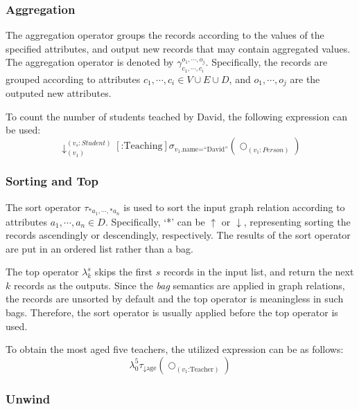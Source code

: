 \subsubsection{Aggregation}
The aggregation operator groups the records according to the values of the specified attributes, and output new records that may contain aggregated values.
The aggregation operator is denoted by $\gamma_{c_1, \cdots, c_i}^{o_1, \cdots, o_j}$.
Specifically, the records are grouped according to attributes $c_1, \cdots, c_i \in V \cup E \cup D$, and $o_1, \cdots, o_j$ are the outputed new attributes.

\begin{example}
    To count the number of students teached by David, the following expression can be used:
    \begin{equation*}
        \downarrow_{(v_1)}^{(v_s:Student)}[\text{:Teaching}]\sigma_{v_1\text{.name=``David''}}(\bigcirc_{(v_1:Person)})
    \end{equation*}
\end{example}

\subsubsection{Sorting and Top}

The sort operator $\tau_{* a_1, \cdots, * a_n}$ is used to sort the input graph relation according to attributes $a_1, \cdots, a_n \in D$.
Specifically, `*' can be $\uparrow$ or $\downarrow$, representing sorting the records ascendingly or descendingly, respectively.
The results of the sort operator are put in an ordered list rather than a bag.

The top operator $\lambda_k^s$ skips the first $s$ records in the input list, and return the next $k$ records as the outputs.
Since the \emph{bag} semantics are applied in graph relations, the records are unsorted by default and the top operator is meaningless in such bags. 
Therefore, the sort operator is usually applied before the top operator is used.

\begin{example}
    To obtain the most aged five teachers, the utilized expression can be as follows:
    \begin{equation*}
        \lambda_{0}^{5}\tau_{\downarrow \text{age}}(\bigcirc_{(v_1\text{:Teacher})})
    \end{equation*}
\end{example}


\subsubsection{Unwind}

